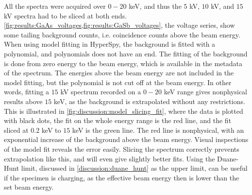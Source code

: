 All the spectra were acquired over $0-20$ keV, and thus the $5$ kV, $10$ kV, and $15$ kV spectra had to be sliced at both ends.
\cref{fig:results:GaAs_voltages,fig:results:GaSb_voltages}, the voltage series, show some tailing background counts, i.e. coincidence counts above the beam energy.
When using model fitting in HyperSpy, the background is fitted with a polynomial, and polynomials does not have an end.
The fitting of the background is done from zero energy to the beam energy, which is available in the metadata of the spectrum.
The energies above the beam energy are not included in the model fitting, but the polynomial is not cut off at the beam energy.
In other words, fitting a $15$ kV spectrum recorded on a $0-20$ keV range gives nonphysical results above $15$ keV, as the background is extrapolated without any restrictions.
This is illustrated in \cref{fig:discussion:model_slicing_fit}, where the data is plotted with black dots, the fit on the whole energy range is the red line, and the fit sliced at $0.2$ keV to $15$ keV is the green line.
The red line is nonphysical, with an exponential increase of the background above the beam energy.
Visual inspections of the model fit reveals the error easily.
Slicing the spectrum correctly prevents extrapolation like this, and will even give slightly better fits.
Using the Duane-Hunt limit, discussed in \cref{discussion:duane_hunt} as the upper limit, can be useful if the specimen is charging, as the effective beam energy then is lower than the set beam energy.


